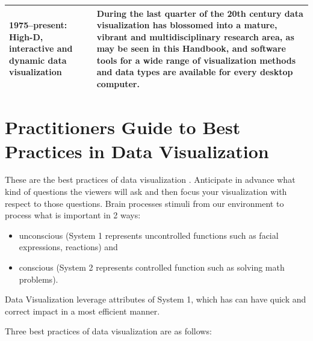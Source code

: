 \documentclass[]{book}
\providecommand{\tightlist}{%
  \setlength{\itemsep}{0pt}\setlength{\parskip}{0pt}}
\theoremstyle{definition}
\theoremstyle{definition}
\theoremstyle{definition}
\theoremstyle{remark}
\begin{document}
\begin{longtable}[]{@{}ll@{}}
\begin{minipage}[t]{0.16\columnwidth}
1975--present: High-D, interactive and dynamic data visualization\strut
\end{minipage} & \begin{minipage}[t]{0.78\columnwidth}\raggedright\strut
During the last quarter of the 20th century data visualization has
blossomed into a mature, vibrant and multidisciplinary research area, as
may be seen in this Handbook, and software tools for a wide range of
visualization methods and data types are available for every desktop
computer.\strut
\end{minipage}\tabularnewline
\bottomrule
\end{longtable}

\section{Practitioners Guide to Best Practices in Data
Visualization}\label{practitioners-guide-to-best-practices-in-data-visualization}

These are the best practices of data visualization
\citep{best-practice}. Anticipate in advance what kind of questions the
viewers will ask and then focus your visualization with respect to those
questions. Brain processes stimuli from our environment to process what
is important in 2 ways:

\begin{itemize}
\tightlist
\item
  unconscious (System 1 represents uncontrolled functions such as facial
  expressions, reactions) and
\item
  conscious (System 2 represents controlled function such as solving
  math problems).
\end{itemize}

Data Visualization leverage attributes of System 1, which has can have
quick and correct impact in a most efficient manner.

Three best practices of data visualization are as follows:
\end{document}
